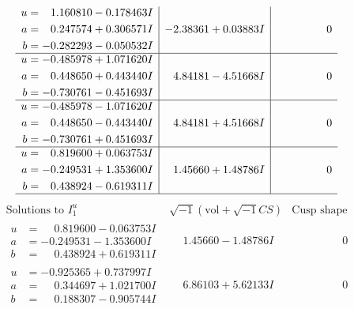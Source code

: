 \documentclass[1p]{elsarticle_modified}
\theoremstyle{definition}
\newcommand{\I}{\sqrt{-1}}
\begin{document}
$$\begin{array}{c|c|c}
\begin{aligned}
u &= \phantom{-}1.160810 - 0.178463 I \\
a &= \phantom{-}0.247574 + 0.306571 I \\
b &= -0.282293 - 0.050532 I\end{aligned}
 & -2.38361 + 0.03883 I & \phantom{-0.000000 } 0 \\ \hline\begin{aligned}
u &= -0.485978 + 1.071620 I \\
a &= \phantom{-}0.448650 + 0.443440 I \\
b &= -0.730761 - 0.451693 I\end{aligned}
 & \phantom{-}4.84181 - 4.51668 I & \phantom{-0.000000 } 0 \\ \hline\begin{aligned}
u &= -0.485978 - 1.071620 I \\
a &= \phantom{-}0.448650 - 0.443440 I \\
b &= -0.730761 + 0.451693 I\end{aligned}
 & \phantom{-}4.84181 + 4.51668 I & \phantom{-0.000000 } 0 \\ \hline\begin{aligned}
u &= \phantom{-}0.819600 + 0.063753 I \\
a &= -0.249531 + 1.353600 I \\
b &= \phantom{-}0.438924 - 0.619311 I\end{aligned}
 & \phantom{-}1.45660 + 1.48786 I & \phantom{-0.000000 } 0\\
 \hline 
 \end{array}$$\newpage$$\begin{array}{c|c|c}  
\text{Solutions to }I^u_{1}& \I (\text{vol} + \sqrt{-1}CS) & \text{Cusp shape}\\
 \hline 
\begin{aligned}
u &= \phantom{-}0.819600 - 0.063753 I \\
a &= -0.249531 - 1.353600 I \\
b &= \phantom{-}0.438924 + 0.619311 I\end{aligned}
 & \phantom{-}1.45660 - 1.48786 I & \phantom{-0.000000 } 0 \\ \hline\begin{aligned}
u &= -0.925365 + 0.737997 I \\
a &= \phantom{-}0.344697 + 1.021700 I \\
b &= \phantom{-}0.188307 - 0.905744 I\end{aligned}
 & \phantom{-}6.86103 + 5.62133 I & \phantom{-0.000000 } 0 \\ \hline\begin{aligned}

\end{aligned}
\end{array}$$
\end{document}
